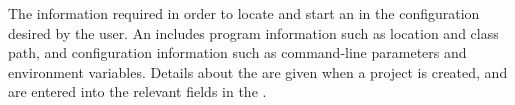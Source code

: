 \item[AUT Configuration]{
The information required in order to locate and start an \gdaut{} in the configuration desired by the user.
An  includes program information such as  location and class path, and \gdaut configuration information such as command-line parameters and environment variables. Details  about the \gdaut are given when a project is created, and are entered into the relevant
fields in the \gdsuiteeditor{}.  
}
